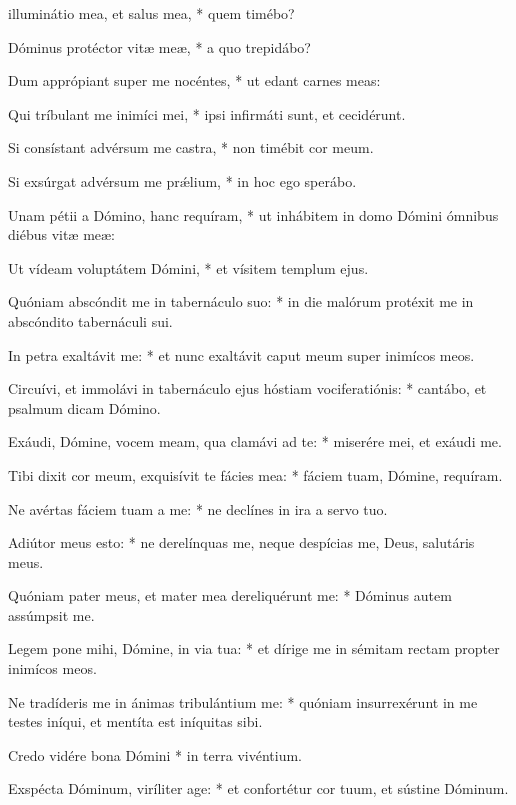 \begin{psalmus}

 illuminátio mea, et salus mea, * quem timébo?

Dóminus protéctor vitæ meæ, * a quo trepidábo?

Dum apprópiant super me nocéntes, * ut edant carnes meas:

Qui tríbulant me inimíci mei, * ipsi infirmáti sunt, et cecidérunt.

Si consístant advérsum me castra, * non timébit cor meum.

Si exsúrgat advérsum me prǽlium, * in hoc ego sperábo.

Unam pétii a Dómino, hanc requíram, * ut inhábitem in domo Dómini ómnibus diébus vitæ meæ:

Ut vídeam voluptátem Dómini, * et vísitem templum ejus.

Quóniam abscóndit me in tabernáculo suo: * in die malórum protéxit me in abscóndito tabernáculi sui.

In petra exaltávit me: * et nunc exaltávit caput meum super inimícos meos.

Circuívi, et immolávi in tabernáculo ejus hóstiam vociferatiónis: * cantábo, et psalmum dicam Dómino.

Exáudi, Dómine, vocem meam, qua clamávi ad te: * miserére mei, et exáudi me.

Tibi dixit cor meum, exquisívit te fácies mea: * fáciem tuam, Dómine, requíram.

Ne avértas fáciem tuam a me: * ne declínes in ira a servo tuo.

Adiútor meus esto: * ne derelínquas me, neque despícias me, Deus, salutáris meus.

Quóniam pater meus, et mater mea dereliquérunt me: * Dóminus autem assúmpsit me.

Legem pone mihi, Dómine, in via tua: * et dírige me in sémitam rectam propter inimícos meos.

Ne tradíderis me in ánimas tribulántium me: * quóniam insurrexérunt in me testes iníqui, et mentíta est iníquitas sibi.

Credo vidére bona Dómini * in terra vivéntium.

Exspécta Dóminum, viríliter age: * et confortétur cor tuum, et sústine Dóminum.

\end{psalmus}
